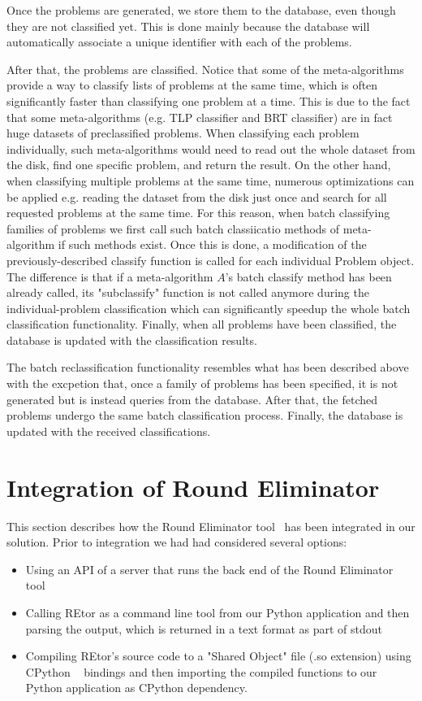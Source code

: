 Once the problems are generated, we store them to the database,
even though they are not classified yet. This is done mainly
because the database will automatically associate a unique
identifier with each of the problems.

After that, the problems are classified. Notice that
some of the meta-algorithms provide a way to classify
lists of problems at the same time, which is often
significantly faster than classifying one problem at a time.
This is due to the fact that some meta-algorithms
(e.g. TLP classifier and BRT classifier) are in fact
huge datasets of preclassified problems. When
classifying each problem individually, such
meta-algorithms would need to read out the whole
dataset from the disk, find one specific problem,
and return the result. On the other hand, when
classifying multiple problems at the same time,
numerous optimizations can be applied e.g. reading the 
dataset from the disk just once and search for all
requested problems at the same time. For this reason,
when batch classifying families of problems we first
call such batch classiicatio methods of meta-algorithm
if such methods exist. Once this is done, a modification
of the previously-described classify function is called
for each individual Problem object. The difference is
that if a meta-algorithm $A$'s batch classify method has been
already called, its "subclassify" function is not called
anymore during the individual-problem classification which
can significantly speedup the whole batch classification
functionality. Finally, when all problems have been classified,
the database is updated with the classification results.

The batch reclassification functionality resembles
what has been described above with the excpetion that,
once a family of problems has been specified, it is
not generated but is instead queries from the database.
After that, the fetched problems undergo the same
batch classification process. Finally, the database is
updated with the received classifications.

\section{Integration of Round Eliminator}

This section describes how the Round Eliminator
tool~\cite{Olivetti2020} has been integrated in our solution.
Prior to integration we had had considered several options:

\begin{itemize}
  \item Using an API of a server that runs the back end of the Round Eliminator tool
  \item Calling REtor as a command line tool from our Python
  application and then parsing the output, which is returned
  in a text format as part of stdout~\cite{stdio}
  \item Compiling REtor's source code to a "Shared Object" file (.so extension)
  using CPython ~\cite{CPython} bindings and then importing the compiled
  functions to our Python application as CPython dependency.
\end{itemize}

